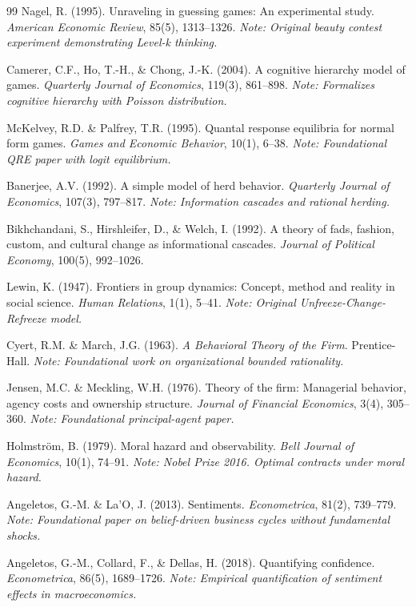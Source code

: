 \begin{thebibliography}{99}
 Nagel, R. (1995). Unraveling in guessing games: An experimental study. \textit{American Economic Review}, 85(5), 1313--1326. \textit{Note: Original beauty contest experiment demonstrating Level-k thinking.}

 Camerer, C.F., Ho, T.-H., \& Chong, J.-K. (2004). A cognitive hierarchy model of games. \textit{Quarterly Journal of Economics}, 119(3), 861--898. \textit{Note: Formalizes cognitive hierarchy with Poisson distribution.}

 McKelvey, R.D. \& Palfrey, T.R. (1995). Quantal response equilibria for normal form games. \textit{Games and Economic Behavior}, 10(1), 6--38. \textit{Note: Foundational QRE paper with logit equilibrium.}

 Banerjee, A.V. (1992). A simple model of herd behavior. \textit{Quarterly Journal of Economics}, 107(3), 797--817. \textit{Note: Information cascades and rational herding.}

 Bikhchandani, S., Hirshleifer, D., \& Welch, I. (1992). A theory of fads, fashion, custom, and cultural change as informational cascades. \textit{Journal of Political Economy}, 100(5), 992--1026.

 Lewin, K. (1947). Frontiers in group dynamics: Concept, method and reality in social science. \textit{Human Relations}, 1(1), 5--41. \textit{Note: Original Unfreeze-Change-Refreeze model.}

 Cyert, R.M. \& March, J.G. (1963). \textit{A Behavioral Theory of the Firm}. Prentice-Hall. \textit{Note: Foundational work on organizational bounded rationality.}

 Jensen, M.C. \& Meckling, W.H. (1976). Theory of the firm: Managerial behavior, agency costs and ownership structure. \textit{Journal of Financial Economics}, 3(4), 305--360. \textit{Note: Foundational principal-agent paper.}

 Holmström, B. (1979). Moral hazard and observability. \textit{Bell Journal of Economics}, 10(1), 74--91. \textit{Note: Nobel Prize 2016. Optimal contracts under moral hazard.}

 Angeletos, G.-M. \& La'O, J. (2013). Sentiments. \textit{Econometrica}, 81(2), 739--779. \textit{Note: Foundational paper on belief-driven business cycles without fundamental shocks.}

 Angeletos, G.-M., Collard, F., \& Dellas, H. (2018). Quantifying confidence. \textit{Econometrica}, 86(5), 1689--1726. \textit{Note: Empirical quantification of sentiment effects in macroeconomics.}


\end{thebibliography}
